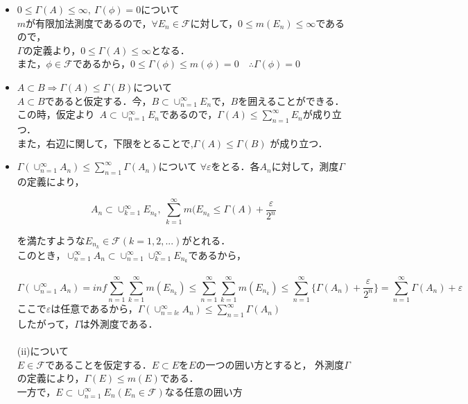 \documentclass[11pt, a4paper, dvipdfmx]{jsarticle}
\theoremstyle{definition}
\newcommand{\e}{\varepsilon}
\newcommand{\F}{\mathcal{F}}
\begin{document}
\begin{itemize}
  \item $0 \le \Gamma(A) \le \infty,~ \Gamma(\phi) = 0$について\\
  $m$が有限加法測度であるので，$\forall E_n \in \F$に対して，$0 \le m(E_n) \le \infty$であるので，\\
  $\Gamma$の定義より，$0 \le \Gamma(A) \le \infty$となる．\\
  また，$\phi \in \F$であるから，$0 \le \Gamma(\phi) \le m(\phi) = 0$~~$\therefore \Gamma(\phi) = 0$
  \\
  \item $A \subset B \Rightarrow \Gamma(A) \le \Gamma(B)$について\\
  $A \subset B$であると仮定する．今，$B \subset \cup_{n=1}^{\infty}E_n$で，$B$を囲えることができる．\\
  この時，仮定より~$A \subset \cup_{n=1}^{\infty}E_n$であるので，$\Gamma(A) \le \sum_{n=1}^{\infty}E_n$が成り立つ．\\
  また，右辺に関して，下限をとることで,$ \Gamma(A) \le \Gamma(B)$ が成り立つ．
  \\
  \item  $\Gamma(\cup_{n=1}^{\infty}A_n) \le \sum_{n=1}^{\infty} \Gamma(A_n)$について
  $\forall \e $をとる．各$A_n$に対して，測度$\Gamma$の定義により，
  \begin{center}
  $$A_n \subset \cup_{k=1}^{\infty} E_{n_{k}},~\sum_{k=1}^{\infty}m(E_{n_{k}} \le \Gamma(A)+\frac{\e}{2^n}$$
  \end{center}
  を満たすような$E_{n_{k}} \in \F(k = 1,2,...)$がとれる．\\
  このとき，$\cup_{n=1}^{\infty}A_n \subset \cup_{n=1}^{\infty}\cup_{k=1}^{\infty}E_{n_{k}}$であるから，\\
　$$\Gamma(\cup_{n=1}^{\infty}A_n) = inf\sum_{n=1}^{\infty}\sum_{k=1}^{\infty}m(E_{n_{k}}) \le \sum_{n=1}^{\infty}\sum_{k=1}^{\infty}m(E_{n_{k}})
  \le \sum_{n=1}^{\infty}\{\Gamma(A_n) + \frac{\e}{2^n}\} = \sum_{n=1}^{\infty}\Gamma(A_n) + \e
  $$
  ここで$\e$は任意であるから，$\Gamma(\cup_{n=le}^{\infty}A_n) \le \sum_{n=1}^{\infty}\Gamma(A_n)$\\
  したがって，$\Gamma$は外測度である．\\
  \\
  (ii)について\\
  $E \in \F$であることを仮定する．$E \subset E$を$E$の一つの囲い方とすると，
  外測度$\Gamma$の定義により，$\Gamma(E) \le m(E)$である．\\
  一方で，$E \subset \cup^{\infty}_{n=1}E_n(E_n \in \F)$なる任意の囲い方

\end{itemize}
\end{document}
